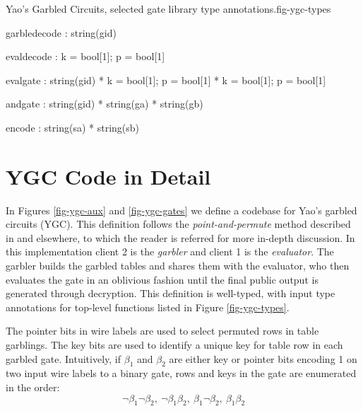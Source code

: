 \begin{fpfig}{Yao's Garbled Circuits, selected gate library type annotations.}{fig-ygc-types}
{\footnotesize
\begin{verbatimtab}
  garbledecode : string(gid)
  
  evaldecode   : { k = bool[1]; p = bool[1] }
  
  evalgate     : string(gid) *  { k = bool[1]; p = bool[1] } * { k = bool[1]; p = bool[1] }
  
  andgate      : string(gid) * string(ga) * string(gb) 

  encode       : string(sa) * string(sb)
\end{verbatimtab}
}
\end{fpfig}

  
%    

\section{YGC Code in Detail}
\label{section-ygc}

In Figures \ref{fig-ygc-aux} and \ref{fig-ygc-gates} we define a
codebase for Yao's garbled circuits (YGC). This definition follows the
\emph{point-and-permute} method described in \cite{evans2018pragmatic}
and elsewhere, to which the reader is referred for more in-depth discussion.
In this implementation client 2 is the \emph{garbler} and
client 1 is the \emph{evaluator}. The garbler builds the garbled
tables and shares them with the evaluator, who then evaluates
the gate in an oblivious fashion until the final public output is
generated through decryption. This definition is well-typed,
with input type annotations for top-level functions listed in
Figure \ref{fig-ygc-types}. 

The pointer bits in wire labels are used to select permuted rows in
table garblings. The key bits are used to identify a unique key for
table row in each garbled gate. Intuitively, if $\beta_1$ and
$\beta_2$ are either key or pointer bits encoding 1 on two input wire
labels to a binary gate, rows and keys in the gate are enumerated in
the order:
$$
\neg\beta_1\neg\beta_2,\ \neg\beta_1\beta_2,\ \beta_1\neg\beta_2,\ \beta_1\beta_2
$$

